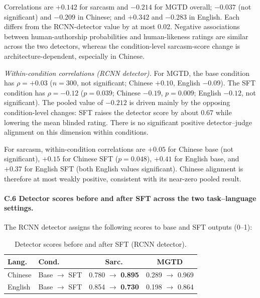 Correlations are $+0.142$ for sarcasm and $-0.214$ for MGTD overall; $-0.037$ (not significant) and $-0.209$ in Chinese; and $+0.342$ and $-0.283$ in English. Each differs from the RCNN-detector value by at most 0.02. Negative associations between human-authorship probabilities and human-likeness ratings are similar across the two detectors, whereas the condition-level sarcasm-score change is architecture-dependent, especially in Chinese.

\emph{Within-condition correlations (RCNN detector).} For MGTD, the base condition has $\rho = +0.03$ ($n = 300$, not significant; Chinese $+0.10$, English $-0.09$). The SFT condition has $\rho = -0.12$ ($p = 0.039$; Chinese $-0.19$, $p = 0.009$; English $-0.12$, not significant). The pooled value of $-0.212$ is driven mainly by the opposing condition-level changes: SFT raises the detector score by about 0.67 while lowering the mean blinded rating. There is no significant positive detector--judge alignment on this dimension within conditions.

For sarcasm, within-condition correlations are $+0.05$ for Chinese base (not significant), $+0.15$ for Chinese SFT ($p = 0.048$), $+0.41$ for English base, and $+0.37$ for English SFT (both English values significant). Chinese alignment is therefore at most weakly positive, consistent with its near-zero pooled result.

\paragraph{C.6 Detector scores before and after SFT across the two task--language settings.} The RCNN detector assigns the following scores to base and SFT outputs (0--1):

\begin{table}[h]
  \centering
  \footnotesize
  \setlength{\tabcolsep}{2pt}
  \begin{tabular}{@{}llcc@{}}
    \toprule
    \textbf{Lang.} & \textbf{Cond.} & \textbf{Sarc.} & \textbf{MGTD} \\
    \midrule
    Chinese & Base $\to$ SFT & 0.780 $\to$ \textbf{0.895} & 0.289 $\to$ 0.969 \\
    English & Base $\to$ SFT & 0.854 $\to$ \textbf{0.730} & 0.198 $\to$ 0.864 \\
    \bottomrule
  \end{tabular}
  \caption{Detector scores before and after SFT (RCNN detector).}
  \label{tab:sft-scores}
\end{table}

